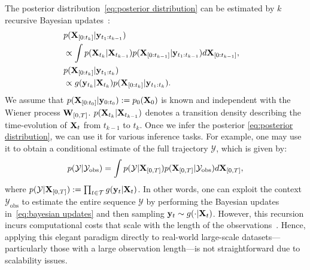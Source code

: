 The posterior distribution~\eqref{eq:posterior distribution} can be estimated by $k$ recursive Bayesian updates~\citep{särkkä2013bayesian}:
\begin{align}\label{eq:bayesian updates}
\lefteqn{p(\bX_{[0:t_k]} | \by_{t_1:t_{k-1}})}\nonumber\\
&\propto  \int  p(\bX_{t_k} | \bX_{t_{k-1}}) p(\bX_{[0:t_{k-1}]} |\by_{t_1:t_{k-1}}) d\bX_{[0:t_{k-1}]}, \nonumber\\
\lefteqn{p(\bX_{[0:t_k]} | \by_{t_1:t_{k}})}\nonumber\\ &\propto g(\by_{t_k} | \bX_{t_k})p(\bX_{[0:t_k]} |\by_{t_1:t_{k}}).
\end{align}
We assume that $p(\mathbf{X}_{[0:t_0]} | \mathbf{y}_{0:t_0}) := p_0(\mathbf{X}_0)$ is known and independent with the Wiener process $\mathbf{W}_{[0, T]}$.  $p(\mathbf{X}_{t_k} | \mathbf{X}_{t_{k-1}})$ denotes a transition density describing the time-evolution of $\mathbf{X}_t$ from $t_{k-1}$ to $t_k$. 
Once we infer the posterior \eqref{eq:posterior distribution}, we can use it for various inference tasks. For example, one may use it to obtain a conditional estimate of the full trajectory $\mathcal{Y}$, which is given by:
\[\label{eq:full trajectory estimation}
    p(\mathcal{Y} | \mathcal{Y}_{\text{obs}}) = \int p(\mathcal{Y} | \mathbf{X}_{[0, T]}) p(\mathbf{X}_{[0, T]} | \mathcal{Y}_{\text{obs}}) d\mathbf{X}_{[0,  T]},
\]
where $p(\mathcal{Y} | \mathbf{X}_{[0, T]}) := \prod_{t \in \mathcal{T}} g(\mathbf{y}_t | \mathbf{X}_t)$. In other words, one can exploit the context $\mathcal{Y}_{\text{obs}}$ to estimate the entire sequence $\mathcal{Y}$ by performing the Bayesian updates in~\eqref{eq:bayesian updates} and then sampling $\mathbf{y}_t \sim g(\cdot | \mathbf{X}_t)$.
However, this recursion incurs computational costs that scale with the length of the observations~\citep{sarkka2020temporal}.
Hence, applying this elegant paradigm directly to real-world large-scale datasets---particularly those with a large observation length---is not straightforward due to scalability issues.